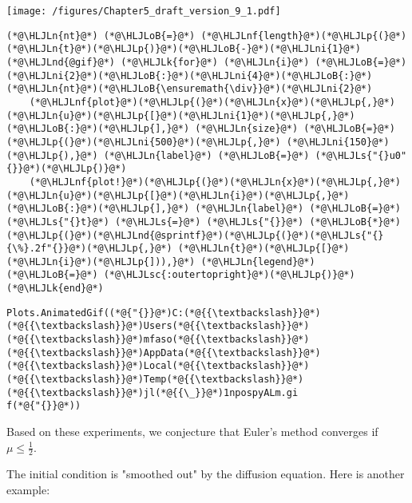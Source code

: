 \documentclass[12pt,landscape]{article}
\newcommand{\HLJLk}[1]{\textcolor[RGB]{148,91,176}{\textbf{#1}}}
\newcommand{\HLJLn}[1]{#1}
\newcommand{\HLJLnd}[1]{\textcolor[RGB]{214,102,97}{#1}}
\newcommand{\HLJLnf}[1]{\textcolor[RGB]{66,102,213}{#1}}
\newcommand{\HLJLs}[1]{\textcolor[RGB]{201,61,57}{#1}}
\newcommand{\HLJLsc}[1]{\textcolor[RGB]{201,61,57}{#1}}
\newcommand{\HLJLni}[1]{\textcolor[RGB]{59,151,46}{#1}}
\newcommand{\HLJLoB}[1]{\textcolor[RGB]{102,102,102}{\textbf{#1}}}
\newcommand{\HLJLp}[1]{#1}
\begin{document}
{\texttt{[image: /figures/Chapter5\_draft\_version\_9\_1.pdf]}

\begin{lstlisting}
(*@\HLJLn{nt}@*) (*@\HLJLoB{=}@*) (*@\HLJLnf{length}@*)(*@\HLJLp{(}@*)(*@\HLJLn{t}@*)(*@\HLJLp{)}@*)(*@\HLJLoB{-}@*)(*@\HLJLni{1}@*)
(*@\HLJLnd{@gif}@*) (*@\HLJLk{for}@*) (*@\HLJLn{i}@*) (*@\HLJLoB{=}@*) (*@\HLJLni{2}@*)(*@\HLJLoB{:}@*)(*@\HLJLni{4}@*)(*@\HLJLoB{:}@*)(*@\HLJLn{nt}@*)(*@\HLJLoB{\ensuremath{\div}}@*)(*@\HLJLni{2}@*) 
    (*@\HLJLnf{plot}@*)(*@\HLJLp{(}@*)(*@\HLJLn{x}@*)(*@\HLJLp{,}@*) (*@\HLJLn{u}@*)(*@\HLJLp{[}@*)(*@\HLJLni{1}@*)(*@\HLJLp{,}@*)(*@\HLJLoB{:}@*)(*@\HLJLp{],}@*) (*@\HLJLn{size}@*) (*@\HLJLoB{=}@*) (*@\HLJLp{(}@*)(*@\HLJLni{500}@*)(*@\HLJLp{,}@*) (*@\HLJLni{150}@*)(*@\HLJLp{),}@*) (*@\HLJLn{label}@*) (*@\HLJLoB{=}@*) (*@\HLJLs{"{}u0"{}}@*)(*@\HLJLp{)}@*)
    (*@\HLJLnf{plot!}@*)(*@\HLJLp{(}@*)(*@\HLJLn{x}@*)(*@\HLJLp{,}@*) (*@\HLJLn{u}@*)(*@\HLJLp{[}@*)(*@\HLJLn{i}@*)(*@\HLJLp{,}@*)(*@\HLJLoB{:}@*)(*@\HLJLp{],}@*) (*@\HLJLn{label}@*) (*@\HLJLoB{=}@*) (*@\HLJLs{"{}t}@*) (*@\HLJLs{=}@*) (*@\HLJLs{"{}}@*) (*@\HLJLoB{*}@*) (*@\HLJLp{(}@*)(*@\HLJLnd{@sprintf}@*)(*@\HLJLp{(}@*)(*@\HLJLs{"{}{\%}.2f"{}}@*)(*@\HLJLp{,}@*) (*@\HLJLn{t}@*)(*@\HLJLp{[}@*)(*@\HLJLn{i}@*)(*@\HLJLp{])),}@*) (*@\HLJLn{legend}@*) (*@\HLJLoB{=}@*) (*@\HLJLsc{:outertopright}@*)(*@\HLJLp{)}@*)
(*@\HLJLk{end}@*)
\end{lstlisting}

\begin{lstlisting}
Plots.AnimatedGif((*@{"{}}@*)C:(*@{{\textbackslash}}@*)(*@{{\textbackslash}}@*)Users(*@{{\textbackslash}}@*)(*@{{\textbackslash}}@*)mfaso(*@{{\textbackslash}}@*)(*@{{\textbackslash}}@*)AppData(*@{{\textbackslash}}@*)(*@{{\textbackslash}}@*)Local(*@{{\textbackslash}}@*)(*@{{\textbackslash}}@*)Temp(*@{{\textbackslash}}@*)(*@{{\textbackslash}}@*)jl(*@{{\_}}@*)1npospyALm.gi
f(*@{"{}}@*))
\end{lstlisting}


Based on these experiments, we conjecture that Euler's method converges if $\mu \leq \frac{1}{2}$.

The initial condition is "smoothed out" by the diffusion equation.  Here is another example:


}
\end{document}
